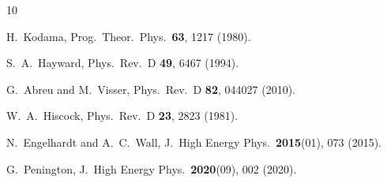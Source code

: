 \documentclass[prl,twocolumn,superscriptaddress,longbibliography,floatfix]{revtex4-2}
\begin{document}
\begin{thebibliography}{10}

H.~Kodama,
Prog.\ Theor.\ Phys.\ \textbf{63}, 1217 (1980).

S.~A.~Hayward,
Phys.\ Rev.\ D \textbf{49}, 6467 (1994).

G.~Abreu and M.~Visser,
Phys.\ Rev.\ D \textbf{82}, 044027 (2010).

W.~A.~Hiscock,
Phys.\ Rev.\ D \textbf{23}, 2823 (1981).

N.~Engelhardt and A.~C.~Wall,
J.\ High Energy Phys.\ \textbf{2015}(01), 073 (2015).

G.~Penington,
J.\ High Energy Phys.\ \textbf{2020}(09), 002 (2020).

\end{thebibliography}
\end{document}
